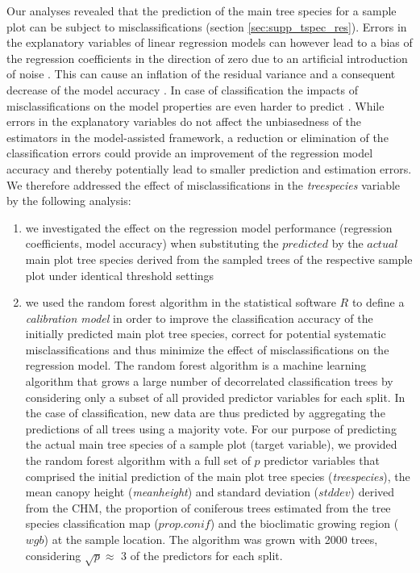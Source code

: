 Our analyses revealed that the prediction of the main tree species for a sample plot can be subject to misclassifications (section \ref{sec:supp_tspec_res}). Errors in the explanatory variables of linear regression models can however lead to a bias of the regression coefficients in the direction of zero due to an artificial introduction of noise \citep{carroll2006}. This can cause an inflation of the residual variance and a consequent decrease of the model accuracy \citep{magnussen2010}. In case of classification the impacts of misclassifications on the model properties are even harder to predict \citep{gustafson2003}. While errors in the explanatory variables do not affect the unbiasedness of the estimators in the model-assisted framework, a reduction or elimination of the classification errors could provide an improvement of the regression model accuracy and thereby potentially lead to smaller prediction and estimation errors. We therefore addressed the effect of misclassifications in the \textit{treespecies} variable by the following analysis:

\renewcommand{\labelenumi}{\alph{enumi})}
\begin{enumerate}

\item {we investigated the effect on the regression model performance (regression coefficients, model accuracy) when substituting the  
$predicted$ by the $actual$ main plot tree species derived from the sampled trees of the respective sample plot under identical threshold settings}

\item {we used the random forest algorithm \citep{liaw2002, breiman2001} in the statistical software $R$ \citep{R} to define a \textit{calibration model} in order to improve the classification accuracy of the initially predicted main plot tree species, correct for potential systematic misclassifications and thus minimize the effect of misclassifications on the regression model. The random forest algorithm is a machine learning algorithm that grows a large number of decorrelated classification trees by considering only a subset of all provided predictor variables for each split. In the case of classification, new data are thus predicted by aggregating the predictions of all trees using a majority vote. For our purpose of predicting the actual main tree species of a sample plot (target variable), we provided the random forest algorithm with a full set of $p$ predictor variables that comprised the initial prediction of the main plot tree species (\textit{treespecies}), the mean canopy height (\textit{meanheight}) and standard deviation ($stddev$) derived from the CHM, the proportion of coniferous trees estimated from the tree species classification map ($prop.conif$) and the bioclimatic growing region ($wgb$) at the sample location. The algorithm was grown with 2000 trees, considering $\sqrt{p} \approx$ 3 of the predictors for each split.}

\end{enumerate}

